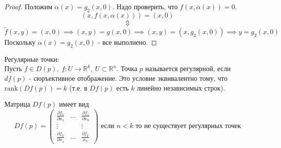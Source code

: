 \begin{theorem}
\begin{proof}
        Положим $\alpha(x) = g_2(x, 0)$. Надо проверить, что $f(x, \alpha(x)) = 0$. 
        \begin{equation*}
            (x, f(x, \alpha(x))) = (x, 0) \end{equation*}
        \[\Updownarrow\]
        \begin{equation*}
            \tilde{f}(x, y) = (x, 0) \implies (x, y) = g(x, 0) \implies (x, y) = (x, g_2(x, 0)) \implies y = g_2(x, 0)
        \end{equation*}
        Поскольку $\alpha(x) = g_2(x, 0)$ - все выполнено.
    \end{proof}
\end{theorem}

\begin{definition}
    Регулярные точки:\\
    Пусть $f \in D(p), \ f:U \to \mathbb{R}^k, \ U \subset \mathbb{R}^n$. Точка $p$ называется регулярной, если $df(p)$ - сюръективное отображение.
    Это условие эквивалентно тому, что $\mathrm{rank}(Df(p)) = k$ (т.е. в $Df(p)$ есть $k$ линейно независимых строк).
\end{definition}

Матрица $Df(p)$ имеет вид 
\[Df(p) = \left(\begin{array}{ccc}
    \frac{\partial f_1}{\partial x_1} & \hdots & \frac{\partial f_1}{\partial x_n} \\
    \vdots & & \vdots \\
    \frac{\partial f_k}{\partial x_1} & \hdots & \frac{\partial f_k}{x_n}
\end{array}\right) \text{ если $n < k$ то не существует регулярных точек}\]


